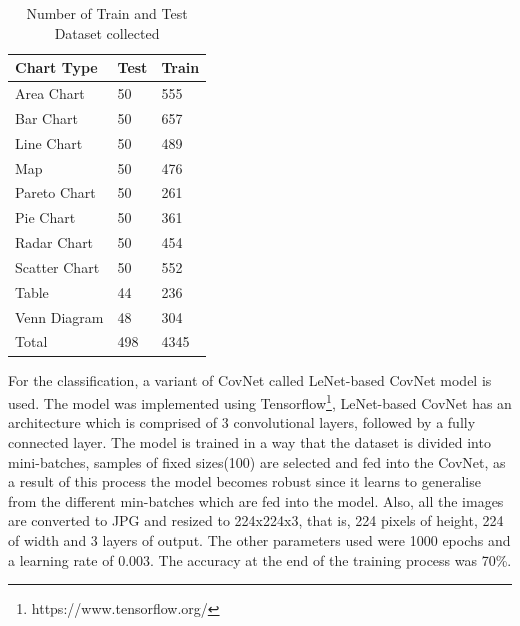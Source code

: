 \documentclass[12pt, a4paper,oneside]{report}
\begin{document}
\begin{table}[h]
	\centering {} \small
	\begin{tabular}{|p{5cm}|p{3cm}|p{3cm}|}
		\hline
		Chart Type & Test & Train \\ \hline
		Area Chart & 50 & 555 \\ \hline
		Bar Chart & 50 & 657 \\ \hline
		Line Chart & 50 & 489 \\ \hline
		Map & 50 & 476 \\ \hline
		Pareto Chart & 50 & 261 \\ \hline	
		Pie Chart & 50 & 361 \\ \hline
		Radar Chart & 50 & 454 \\ \hline
		Scatter Chart & 50 & 552 \\ \hline
		Table & 44 & 236 \\ \hline
		Venn Diagram & 48 & 304 \\ \hline
		Total & 498 & 4345 \\ \hline
		
	\end{tabular}
	\caption {Number of Train and Test Dataset collected}	
	\label{table:rela}
\end{table}

For the classification, a variant of CovNet called LeNet-based CovNet model is used. The model was implemented using Tensorflow\footnote{https://www.tensorflow.org/}, LeNet-based CovNet has an architecture which is comprised of 3 convolutional layers, followed by a fully connected layer. The model is trained in a way that the dataset is divided into mini-batches, samples of fixed sizes(100) are selected and fed into the CovNet, as a result of this process the model becomes robust since it learns to generalise from the different min-batches which are fed into the model. Also, all the images are converted to JPG and resized to 224x224x3, that is, 224 pixels of height, 224 of width and 3 layers of output. The other parameters used were 1000 epochs and a learning rate of 0.003. The accuracy at the end of the training process was 70\%.
\end{document}
